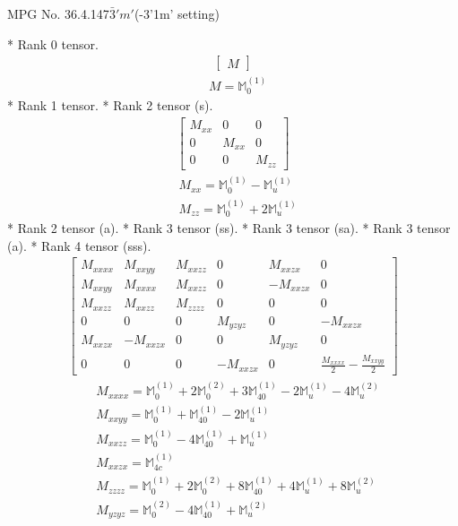 \documentclass[fleqn,8pt,landscape]{jsarticle}
\begin{document}
\setcounter{MaxMatrixCols}{32}

\renewcommand{\tablename}{Table~}
\renewcommand{\figurename}{Figure~}
\begin{center}
\LARGE
MPG No. 36.4.147\quad$\bar{3}'m'$\quad(-3'1m' setting)
\end{center}
* Rank 0 tensor.
\begin{align*}
\begin{bmatrix} M \end{bmatrix}
\end{align*}
\begin{align*}
& M = \mathbb{M}_{0}^{(1)}
\end{align*}
* Rank 1 tensor.
* Rank 2 tensor (s).
\begin{align*}
\begin{bmatrix} M_{xx} & 0 & 0 \\ 0 & M_{xx} & 0 \\ 0 & 0 & M_{zz} \end{bmatrix}
\end{align*}
\begin{align*}
& M_{xx} = \mathbb{M}_{0}^{(1)} - \mathbb{M}_{u}^{(1)} \\
& M_{zz} = \mathbb{M}_{0}^{(1)} + 2 \mathbb{M}_{u}^{(1)}
\end{align*}
* Rank 2 tensor (a).
* Rank 3 tensor (ss).
* Rank 3 tensor (sa).
* Rank 3 tensor (a).
* Rank 4 tensor (sss).
\begin{align*}
\begin{bmatrix} M_{xxxx} & M_{xxyy} & M_{xxzz} & 0 & M_{xxzx} & 0 \\ M_{xxyy} & M_{xxxx} & M_{xxzz} & 0 & - M_{xxzx} & 0 \\ M_{xxzz} & M_{xxzz} & M_{zzzz} & 0 & 0 & 0 \\ 0 & 0 & 0 & M_{yzyz} & 0 & - M_{xxzx} \\ M_{xxzx} & - M_{xxzx} & 0 & 0 & M_{yzyz} & 0 \\ 0 & 0 & 0 & - M_{xxzx} & 0 & \frac{M_{xxxx}}{2} - \frac{M_{xxyy}}{2} \end{bmatrix}
\end{align*}
\begin{align*}
& M_{xxxx} = \mathbb{M}_{0}^{(1)} + 2 \mathbb{M}_{0}^{(2)} + 3 \mathbb{M}_{40}^{(1)} - 2 \mathbb{M}_{u}^{(1)} - 4 \mathbb{M}_{u}^{(2)} \\
& M_{xxyy} = \mathbb{M}_{0}^{(1)} + \mathbb{M}_{40}^{(1)} - 2 \mathbb{M}_{u}^{(1)} \\
& M_{xxzz} = \mathbb{M}_{0}^{(1)} - 4 \mathbb{M}_{40}^{(1)} + \mathbb{M}_{u}^{(1)} \\
& M_{xxzx} = \mathbb{M}_{4c}^{(1)} \\
& M_{zzzz} = \mathbb{M}_{0}^{(1)} + 2 \mathbb{M}_{0}^{(2)} + 8 \mathbb{M}_{40}^{(1)} + 4 \mathbb{M}_{u}^{(1)} + 8 \mathbb{M}_{u}^{(2)} \\
& M_{yzyz} = \mathbb{M}_{0}^{(2)} - 4 \mathbb{M}_{40}^{(1)} + \mathbb{M}_{u}^{(2)}
\end{align*}
\end{document}
